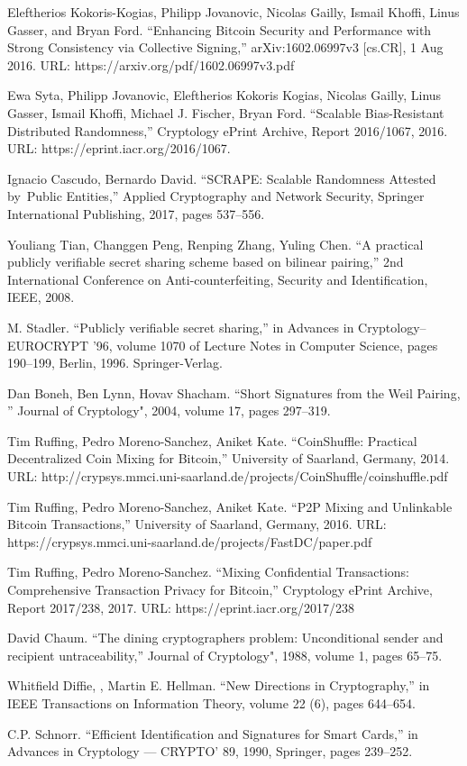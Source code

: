 \documentclass[a4paper, 10pt, conference]{ieeeconf}
\begin{document}
\begin{thebibliography}{99}
 Eleftherios Kokoris-Kogias, Philipp Jovanovic, Nicolas Gailly,
Ismail Khoffi, Linus Gasser, and Bryan Ford. ``Enhancing Bitcoin Security and Performance with Strong Consistency via Collective Signing,'' arXiv:1602.06997v3 [cs.CR], 1 Aug 2016. URL: https://arxiv.org/pdf/1602.06997v3.pdf

 Ewa Syta, Philipp Jovanovic, Eleftherios Kokoris Kogias, Nicolas Gailly, Linus Gasser, Ismail Khoffi, Michael J. Fischer, Bryan Ford. ``Scalable Bias-Resistant Distributed Randomness,'' Cryptology ePrint Archive, Report 2016/1067, 2016. URL: https://eprint.iacr.org/2016/1067.

 Ignacio Cascudo, Bernardo David. ``SCRAPE: Scalable Randomness Attested by Public Entities,'' Applied Cryptography and Network Security, Springer International Publishing, 2017, pages 537--556.

 Youliang Tian, Changgen Peng, Renping Zhang, Yuling Chen. ``A practical publicly verifiable secret sharing scheme based on bilinear pairing,'' 2nd International Conference on Anti-counterfeiting, Security and Identification, IEEE, 2008.

 M. Stadler. ``Publicly verifiable secret sharing,'' in Advances in Cryptology--EUROCRYPT ’96, volume 1070 of Lecture Notes in Computer Science, pages 190--199, Berlin, 1996. Springer-Verlag.

 Dan Boneh, Ben Lynn, Hovav Shacham. ``Short Signatures from the Weil Pairing, '' Journal of Cryptology", 2004, volume 17, pages 297--319.

 Tim Ruffing, Pedro Moreno-Sanchez, Aniket Kate. ``CoinShuffle: Practical Decentralized Coin Mixing for Bitcoin,'' University of Saarland, Germany, 2014. URL: http://crypsys.mmci.uni-saarland.de/projects/CoinShuffle/coinshuffle.pdf

 Tim Ruffing, Pedro Moreno-Sanchez, Aniket Kate. ``P2P Mixing and Unlinkable Bitcoin Transactions,'' University of Saarland, Germany, 2016. URL: https://crypsys.mmci.uni-saarland.de/projects/FastDC/paper.pdf

 Tim Ruffing, Pedro Moreno-Sanchez. ``Mixing Confidential Transactions: Comprehensive Transaction Privacy for Bitcoin,'' Cryptology ePrint Archive, Report 2017/238, 2017. URL: https://eprint.iacr.org/2017/238

 David Chaum. ``The dining cryptographers problem: Unconditional sender and recipient untraceability,'' Journal of Cryptology", 1988, volume 1, pages 65--75.

 Whitfield Diffie, , Martin E. Hellman. ``New Directions in Cryptography,''   in IEEE Transactions on Information Theory, volume 22 (6), pages 644--654. 

 C.P. Schnorr. ``Efficient Identification and Signatures for Smart Cards,''
in Advances in Cryptology --- CRYPTO' 89, 1990, Springer, pages 239--252.

\end{thebibliography}
\end{document}
